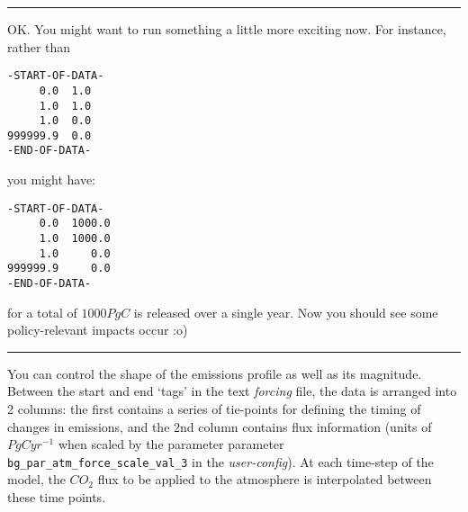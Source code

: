 \vspace{1mm} \noindent\rule{4cm}{0.1mm} \vspace{2mm}

\noindent OK. You might want to run something a little more exciting now. For instance, rather than
\vspace{-2pt}\footnotesize\begin{verbatim}
-START-OF-DATA-
     0.0  1.0
     1.0  1.0
     1.0  0.0
999999.9  0.0
-END-OF-DATA-
\end{verbatim}\normalsize\vspace{-2pt}
you might have:
\vspace{-2pt}\footnotesize\begin{verbatim}
-START-OF-DATA-
     0.0  1000.0
     1.0  1000.0
     1.0     0.0
999999.9     0.0
-END-OF-DATA-
\end{verbatim}\normalsize\vspace{-2pt}
for a total of \(1000 PgC\) is released over a single year. Now you should see some policy-relevant impacts occur :o)

\vspace{1mm} \noindent\rule{4cm}{0.1mm} \vspace{2mm}

\noindent You can control the shape of the emissions profile as well as its magnitude. Between the start and end ‘tags’ in the text \textit{forcing} file, the data is arranged into 2 columns: the first contains a series of tie-points for defining the timing of changes in emissions, and the 2nd column contains flux information (units of \(PgC yr^{-1}\) when scaled by the parameter parameter \texttt{bg\_par\_atm\_force\_scale\_val\_3} in the \textit{user-config}). At each time-step of the model, the \(CO_{2}\) flux to be applied to the atmosphere is interpolated between these time points.

\newpage


